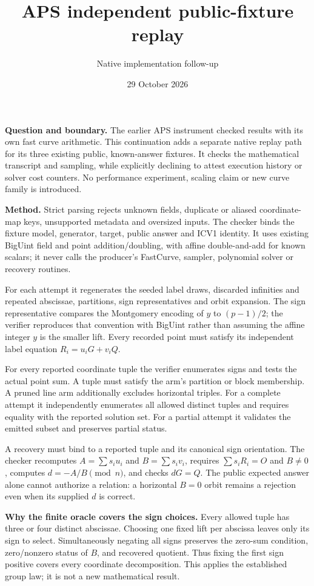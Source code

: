 \documentclass[10pt]{article}
\title{APS independent public-fixture replay}
\author{Native implementation follow-up}
\date{29 October 2026}
\begin{document}
\maketitle
\textbf{Question and boundary.} The earlier APS instrument checked results
with its own fast curve arithmetic. This continuation adds a separate native
replay path for its three existing public, known-answer fixtures. It checks
the mathematical transcript and sampling, while explicitly declining to
attest execution history or solver cost counters. No performance experiment,
scaling claim or new curve family is introduced.

\textbf{Method.} Strict parsing rejects unknown fields, duplicate or aliased
coordinate-map keys, unsupported metadata and oversized inputs. The checker
binds the fixture model, generator, target, public answer and ICV1 identity.
It uses existing BigUint field and point addition/doubling, with affine
double-and-add for known scalars; it never calls the producer's FastCurve,
sampler, polynomial solver or recovery routines.

For each attempt it regenerates the seeded label draws, discarded infinities
and repeated abscissae, partitions, sign representatives and orbit expansion.
The sign representative compares the Montgomery encoding of $y$ to $(p-1)/2$;
the verifier reproduces that convention with BigUint rather than assuming
the affine integer $y$ is the smaller lift. Every recorded point must satisfy
its independent label equation $R_i=u_iG+v_iQ$.

For every reported coordinate tuple the verifier enumerates signs and tests
the actual point sum. A tuple must satisfy the arm's partition or block
membership. A pruned line arm additionally excludes horizontal triples.
For a complete attempt it independently enumerates all allowed distinct
tuples and requires equality with the reported solution set. For a partial
attempt it validates the emitted subset and preserves partial status.

A recovery must bind to a reported tuple and its canonical sign orientation.
The checker recomputes $A=\sum s_i u_i$ and $B=\sum s_i v_i$, requires
$\sum s_iR_i=O$ and $B\ne0$, computes $d=-A/B\pmod n$, and checks $dG=Q$.
The public expected answer alone cannot authorize a relation: a horizontal
$B=0$ orbit remains a rejection even when its supplied $d$ is correct.

\textbf{Why the finite oracle covers the sign choices.} Every allowed tuple
has three or four distinct abscissae. Choosing one fixed lift per abscissa
leaves only its sign to select. Simultaneously negating all signs preserves
the zero-sum condition, zero/nonzero status of $B$, and recovered quotient.
Thus fixing the first sign positive covers every coordinate decomposition.
This applies the established group law; it is not a new mathematical result.
\end{document}
